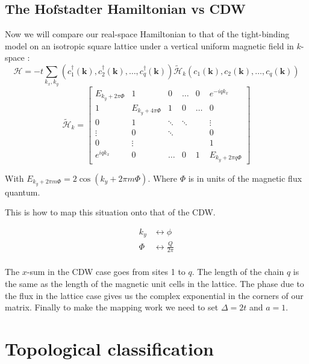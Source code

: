 \documentclass[letterpaper, 10 pt, conference]{ieeeconf}  %
\begin{document}
\subsection{The Hofstadter Hamiltonian vs CDW}
Now we will compare our real-space Hamiltonian to that of the tight-binding model on an
isotropic square lattice under a vertical uniform magnetic field in $k$-space \cite{Yoshioka}:
$$
\mathcal{H}=-t\sum_{k_{x},k_{y}}(c_{1}^{\dagger}(\textbf{k}),c_{2}^{\dagger}(\textbf{k}),\dots,c_{q}^{\dagger}(\textbf{k}))\tilde{\mathcal{H}}_{k}(c_{1}(\textbf{k}),c_{2}(\textbf{k}),\dots,c_{q}(\textbf{k}))
$$
$$
\tilde{\mathcal{H}}_{k}=\begin{bmatrix}
E_{k_{y}+2\pi \Phi}      & 1     & 0      & \hdots     & 0     & e^{-iqk_{x}}  \\
1    &E_{k_{y}+4\pi \Phi} & 1 & 0 & \hdots     & 0 \\
0               & 1 & \ddots & \ddots  &  &\vdots \\
\vdots   & 0 & \ddots &  &  &  0  \\
0 &  \vdots    &  &  &  & 1 \\
e^{iqk_{x}} & 0 &    \hdots          &0   & 1      & E_{k_{y}+2\pi q\Phi}
\end{bmatrix}
$$

With $E_{k_{y}+2\pi m\Phi}=2\cos(k_{y}+2\pi m\Phi)$. Where $\Phi$ is in units of the magnetic flux quantum.

This is how to map this situation onto that of the CDW.

\begin{align*}
k_{y} &\leftrightarrow \phi  \\
\Phi &\leftrightarrow \frac{Q}{2\pi} \\
\end{align*}

The $x$-sum in the CDW case goes from sites 1 to $q$.
The length of the chain $q$ is the same as the length of the magnetic unit cells in the lattice.
The phase due to the flux in the lattice case gives us the complex exponential in the corners of our matrix.
Finally to make the mapping work we need to set $\Delta = 2t$ and $a=1$.


\section{Topological classification}
\end{document}
